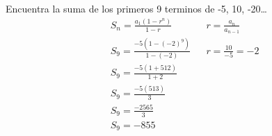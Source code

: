 \documentclass{article}
\begin{document}
\begin{successions}
    Encuentra la suma de los primeros 9 terminos de -5, 10, -20\dots
    \begin{equation}
        \begin{aligned}
            & S_{n} = \frac{a_{1}(1 - r^{n})}{1 - r} && r = \frac{a_{n}}{a_{n-1}}  \\
            & S_{9} = \frac{-5(1 - (-2)^{9})}{1 - (-2)} && r = \frac{10}{-5} = -2 \\
            & S_{9} = \frac{-5(1 + 512)}{1 + 2} \\
            & S_{9} = \frac{-5(513)}{3} \\
            & S_{9} = \frac{-2565}{3} \\
            & S_{9} = -855
        \end{aligned}
    \end{equation}
\end{successions}
\end{document}
